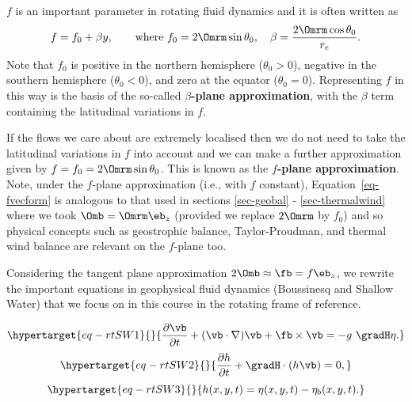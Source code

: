 \documentclass[
  letterpaper,
  twocolumn,
  landscape]{report}
\begin{document}
\(f\) is an important parameter in rotating fluid dynamics and it is
often written as \[
f = f_0 + \beta y, \quad\quad \text{where } f_0= 2\Omrm\sin\theta_0, \quad \beta = \frac{2\Omrm\cos\theta_0}{r_e}.
\] Note that \(f_0\) is positive in the northern hemisphere
(\(\theta_0>0\)), negative in the southern hemisphere (\(\theta_0<0\)),
and zero at the equator (\(\theta_0=0\)). Representing \(f\) in this way
is the basis of the so-called \textbf{\(\beta\)-plane approximation},
with the \(\beta\) term containing the latitudinal variations in \(f\).

If the flows we care about are extremely localised then we do not need
to take the latitudinal variations in \(f\) into account and we can make
a further approximation given by \(f=f_0=2\Omrm\sin\theta_0\). This is
known as the \textbf{\(f\)-plane approximation}. Note, under the
\(f\)-plane approximation (i.e., with \(f\) constant),
Equation~\ref{eq-fvecform} is analogous to that used in sections
\ref{sec-geobal} - \ref{sec-thermalwind} where we took
\(\Omb = \Omrm\eb_z\) (provided we replace \(2\Omrm\) by \(f_0\)) and so
physical concepts such as geostrophic balance, Taylor-Proudman, and
thermal wind balance are relevant on the \(f\)-plane too.

Considering the tangent plane approximation
\(2\Omb \approx \fb=f \eb_z\), we rewrite the important equations in
geophysical fluid dynamics (Boussinesq and Shallow Water) that we focus
on in this course in the rotating frame of reference.

\begin{tcolorbox}[enhanced jigsaw, left=2mm, opacityback=0, coltitle=black, bottomtitle=1mm, title={\textbf{Inviscid Shallow Water Equations}}, toprule=.15mm, colbacktitle=quarto-callout-important-color!10!white, breakable, arc=.35mm, titlerule=0mm, colback=white, toptitle=1mm, opacitybacktitle=0.6, rightrule=.15mm, bottomrule=.15mm, colframe=quarto-callout-important-color-frame, leftrule=.75mm]

\begin{equation}\protect\hypertarget{eq-rtSW1}{}{  \frac{\partial \vb}{\partial t} + (\vb\cdot\nabla)\vb   + \fb\times\vb =  - g \ \gradH \eta. }\label{eq-rtSW1}\end{equation}
\begin{equation}\protect\hypertarget{eq-rtSW2}{}{ \frac{\partial h}{\partial t} + \gradH \cdot (h \vb) = 0,  }\label{eq-rtSW2}\end{equation}
\begin{equation}\protect\hypertarget{eq-rtSW3}{}{  h(x,y,t) = \eta(x,y,t) - \eta_b(x,y,t). }\label{eq-rtSW3}\end{equation}

\end{tcolorbox}
\end{document}
